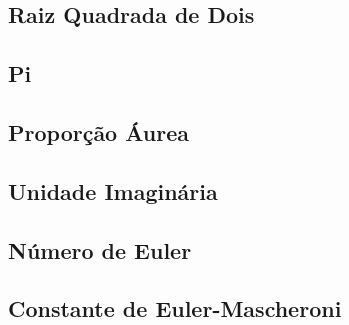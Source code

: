 \subsection{Raiz Quadrada de Dois}
\subsection{Pi}
\subsection{Proporção Áurea}
\subsection{Unidade Imaginária}
\subsection{Número de Euler}
\subsection{Constante de Euler-Mascheroni}